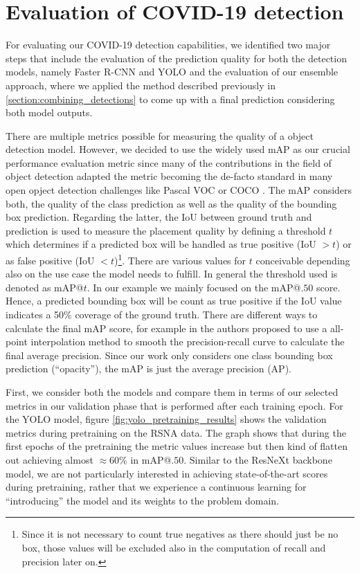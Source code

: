 \section{Evaluation of COVID-19 detection}\label{chapter:eval_rcnn_yolo}
For evaluating our COVID-19 detection capabilities, we identified two major steps that include the evaluation of the prediction quality for both the detection models, namely Faster \ac{R-CNN} and \ac{YOLO} and the evaluation of our ensemble approach, where we applied the method described previously in \ref{section:combining_detections} to come up with a final prediction considering both model outputs. 

There are multiple metrics possible for measuring the quality of a object detection model. However, we decided to use the widely used \acl{mAP} as our crucial performance evaluation metric since many of the contributions in the field of object detection adapted the metric becoming the de-facto standard in many open opject detection challenges like Pascal VOC \autocite{everingham2010pascal} or COCO \autocite{coco}. The \ac{mAP} considers both, the quality of the class prediction as well as the quality of the bounding box prediction. Regarding the latter, the \ac{IoU} between ground truth and prediction is used to measure the placement quality by defining a threshold $t$ which determines if a predicted box will be handled as true positive (\ac{IoU} $> t$) or as false positive (\ac{IoU} $< t$)\footnote{Since it is not necessary to count true negatives as there should just be no box, those values will be excluded also in the computation of recall and precision later on.}. There are various values for $t$ conceivable depending also on the use case the model needs to fulfill. In general the threshold used is denoted as \ac{mAP}@$t$. In our example we mainly focused on the \ac{mAP}@$.50$ score. Hence, a predicted bounding box will be count as true positive if the \ac{IoU} value indicates a 50\% coverage of the ground truth. There are different ways to calculate the final \ac{mAP} score, for example in \autocite{padilla2020survey} the authors proposed to use a all-point interpolation method to smooth the precision-recall curve to calculate the final average precision. Since our work only considers one class bounding box prediction (\enquote{opacity}), the \ac{mAP} is just the average precision (AP).

First, we consider both the models and compare them in terms of our selected metrics in our validation phase that is performed after each training epoch.
For the \ac{YOLO} model, figure \ref{fig:yolo_pretraining_results} shows the validation metrics during pretraining on the \ac{RSNA} data. The graph shows that during the first epochs of the pretraining the metric values increase but then kind of flatten out achieving almost $\approx60\%$ in \ac{mAP}@$.50$. Similar to the ResNeXt backbone model, we are not particularly interested in achieving state-of-the-art scores during pretraining, rather that we experience a continuous learning for \enquote{introducing} the model and its weights to the problem domain.

